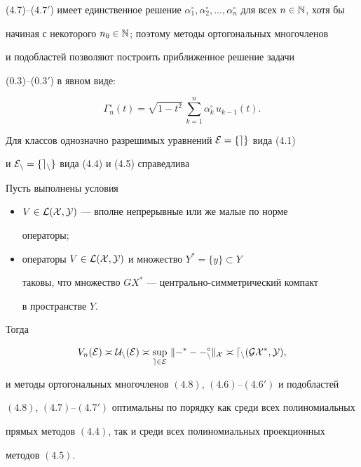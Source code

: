 (4.7)--($4.7'$) имеет единственное решение $\alpha_1^\circ ,


\alpha_2^\circ ,\dotsc ,\alpha_n^\circ $ для всех $n\in \Bbb N$, хотя бы


начиная с некоторого $n_0\in \Bbb N$; поэтому методы ортогональных многочленов


и подобластей позволяют построить приближенное решение задачи


(0.3)--($0.3'$) в явном виде:


\begin{equation}


\Gamma_n^\circ (t)=\sqrt{1-t^2}\,\sum_{k=1}^n\alpha_k^\circ\, u_{k-1}(t).


\end{equation}





Для классов однозначно разрешимых уравнений $\cal E=\{ e\}$ вида (4.1)


и $\cal E_n=\{ e_n\}$ вида (4.4) и (4.5) справедлива





\begin{thms}


Пусть выполнены условия


\begin{itemize}


\item[а)] $V\in \cal L(X,Y)$ --- вполне непрерывные или же малые по норме


операторы$;$


\item[б)] операторы $V\in \cal L(X,Y)$ и множество $Y^*=\{ y\}\subset Y$


таковы, что множество $GX^*$ --- центрально-симметрический компакт


в пространстве $Y$.


\end{itemize}


Тогда


$$


V_n(\cal E)\asymp U_n(\cal E)\asymp \sup_{e\in \cal E}\,


\|\Gamma^*-\Gamma_n^\circ\|_X \asymp d_n(GX^*,Y),


$$


и методы ортогональных многочленов $(4.8)$, $(4.6)$--$(4.6')$ и подобластей


$(4.8)$, $(4.7)$--$(4.7')$ оптимальны по порядку как среди всех полиномиальных


прямых методов $(4.4)$, так и среди всех полиномиальных проекционных


методов $(4.5)$.


\end{thms}





